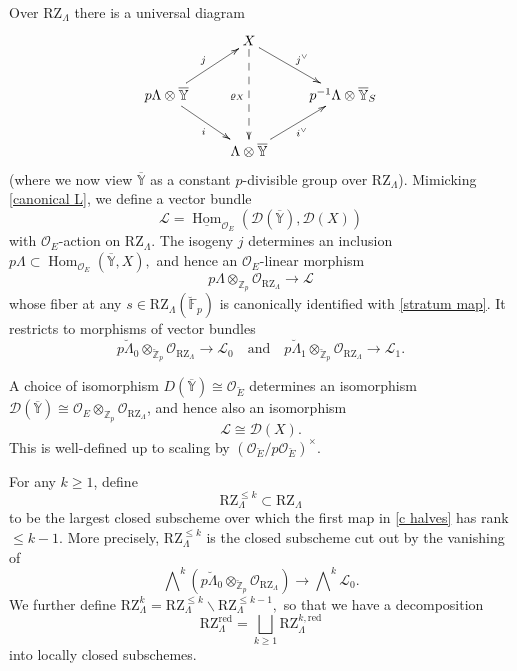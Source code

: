 \documentclass[11pt]{alggeom}
\newcommand{\iso}{\cong}
\newcommand{\red}{\mathrm{red}}
\newcommand{\Z}{\mathbb Z}
\newcommand{\F}{\mathbb F}
\newcommand{\co}{\mathcal O}
\DeclareMathOperator{\Hom}{Hom}
\begin{document}
Over $\mathrm{RZ}_\Lambda$ there is a universal diagram
\begin{equation}\label{complete point diagram}
\xymatrix{
&   {  X  }  \ar[rd]^{j^\vee}  \ar@{-->}[dd]_{\varrho_X} \\
{p\Lambda \otimes \overline{\mathbb{Y}}  } \ar[ur]^{ j } \ar[dr]_i  & &  {p^{-1}\Lambda \otimes \overline{\mathbb{Y}}_S  }  \\
 &  { \Lambda \otimes \overline{\mathbb{Y} }   }  \ar[ur]_{i^\vee}
}
\end{equation}
(where we now view  $\overline{\mathbb{Y}}$ as a constant $p$-divisible group over $\mathrm{RZ}_\Lambda$).
Mimicking \eqref{canonical L}, we define a  vector bundle
 \begin{equation}\label{the L bundle}
\mathscr{L} =  \underline{\Hom}_{\co_E} ( \mathscr{D}(  \overline{\mathbb{Y}} ) ,  \mathscr{D}(X) ) 
 \end{equation}
with $\co_E$-action on $\mathrm{RZ}_\Lambda$.
The isogeny $j$ determines an inclusion 
$
p \Lambda  \subset \Hom_{\co_E} ( \overline{\mathbb{Y}} , X ) ,
$
and hence an  $\co_E$-linear  morphism 
\[
 p \Lambda   \otimes_{ \Z_p} \co_{ \mathrm{RZ}_\Lambda} 
\to  \mathscr{L} 
\]
whose fiber at any $s\in \mathrm{RZ}_\Lambda(\breve{\F}_p)$ is  canonically identified with \eqref{stratum map}.
It restricts to morphisms of vector bundles
\begin{equation}\label{c halves}
 p \breve{\Lambda}_0  \otimes_{ \breve{\Z}_p} \co_{ \mathrm{RZ}_\Lambda}  \to \mathscr{L}_0 
 \quad\mbox{and}\quad
p \breve{\Lambda}_1  \otimes_{ \breve{\Z}_p} \co_{ \mathrm{RZ}_\Lambda}  \to \mathscr{L}_1 .
\end{equation}

\begin{remark}\label{rem:untwist L}
A choice of isomorphism $D(\overline{\mathbb{Y}}) \iso \co_{\breve{E}}$ determines an isomorphism
$\mathscr{D}( \overline{\mathbb{Y}} ) \iso  \co_E \otimes_{\Z_p} \co_{\mathrm{RZ}_\Lambda}$, and hence also an isomorphism
\[
\mathscr{L} \iso \mathscr{D}(X).
\]
This  is  well-defined up to scaling by $( \co_{\breve{E}}  /  p\co_{\breve{E}}) ^\times$.
\end{remark}

 
 

\begin{definition}\label{def:RZk}
For any $k\ge 1$, define
\[
 \mathrm{RZ}_\Lambda^{\le k} \subset  \mathrm{RZ}_\Lambda
 \]
to be the largest closed subscheme over which the first map in \eqref{c halves}  has rank $\le k-1$.  More precisely, $\mathrm{RZ}_\Lambda^{\le k}$ is the closed subscheme cut out by the vanishing of 
\[
  \bigwedge\nolimits^k     ( p \breve{\Lambda}_0  \otimes_{ \breve{\Z}_p} \co_{ \mathrm{RZ}_\Lambda}   )   \to  \bigwedge\nolimits^k  \mathscr{L}_0 .
\]
We further define
$
\mathrm{RZ}_\Lambda^k = \mathrm{RZ}_\Lambda^{\le k} \smallsetminus \mathrm{RZ}_\Lambda^{\le k-1},
$
so that we have a decomposition 
\[
\mathrm{RZ}^\red_\Lambda= \bigsqcup_{k \ge 1} \mathrm{RZ}_\Lambda^{k,\red}
\]
into locally closed subschemes.
\end{definition}
\end{document}
